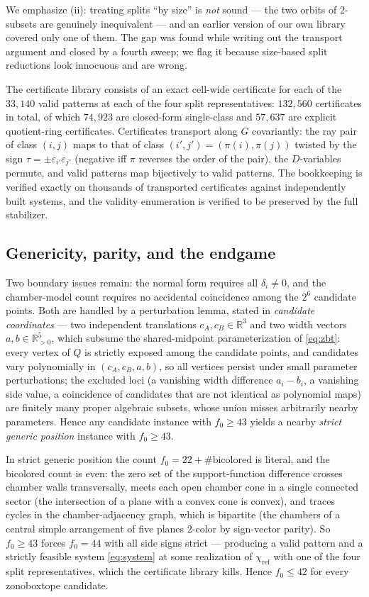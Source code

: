 \documentclass[11pt]{amsart}
\theoremstyle{remark}
\newcommand{\RR}{\mathbb{R}}
\begin{document}
We emphasize (ii): treating splits ``by size'' is \emph{not} sound ---
the two orbits of $2$-subsets are genuinely inequivalent --- and an
earlier version of our own library covered only one of them. The gap
was found while writing out the transport argument and closed by a
fourth sweep; we flag it because size-based split reductions look
innocuous and are wrong.

The certificate library consists of an exact cell-wide certificate for
each of the $33{,}140$ valid patterns at each of the four split
representatives: $132{,}560$ certificates in total, of which $74{,}923$
are closed-form single-class and $57{,}637$ are explicit
quotient-ring certificates. Certificates transport along $G$
covariantly: the ray pair of class $(i,j)$ maps to that of class
$(i',j')=(\pi(i),\pi(j))$ twisted by the sign
$\tau=\pm\varepsilon_{i'}\varepsilon_{j'}$ (negative iff $\pi$
reverses the order of the pair), the $D$-variables permute, and valid
patterns map bijectively to valid patterns. The bookkeeping is verified
exactly on thousands of transported certificates against independently
built systems, and the validity enumeration is verified to be preserved
by the full stabilizer.

\subsection{Genericity, parity, and the endgame}\label{sec:endgame}
Two boundary issues remain: the normal form requires all
$\delta_i\ne 0$, and the chamber-model count requires no accidental
coincidence among the $2^{6}$ candidate points. Both are handled by a
perturbation lemma, stated in \emph{candidate coordinates} --- two
independent translations $c_A, c_B\in\RR^3$ and two width vectors
$a, b\in\RR^{5}_{>0}$, which subsume the shared-midpoint
parameterization of \eqref{eq:zbt}: every vertex of $Q$ is strictly
exposed among the candidate points, and candidates vary polynomially
in $(c_A, c_B, a, b)$, so all vertices persist under small parameter
perturbations; the excluded loci (a vanishing width difference
$a_i-b_i$, a vanishing side value, a coincidence of candidates that
are not identical as polynomial maps) are finitely many proper
algebraic subsets, whose union misses arbitrarily nearby parameters.
Hence any candidate instance with $f_0\ge 43$ yields a nearby
\emph{strict generic position} instance with $f_0\ge 43$.

In strict generic position the count
$f_0 = 22 + \#\text{bicolored}$ is literal, and the bicolored count is
even: the zero set of the support-function difference crosses chamber
walls transversally, meets each open chamber cone in a single
connected sector (the intersection of a plane with a convex cone is
convex), and traces cycles in the chamber-adjacency graph, which
is bipartite (the chambers of a central simple arrangement of five
planes $2$-color by sign-vector parity). So $f_0\ge 43$ forces
$f_0=44$ with all side signs strict --- producing a valid pattern and a
strictly feasible system \eqref{eq:system} at some realization of
$\chi_{\mathrm{ref}}$ with one of the four split representatives, which
the certificate library kills. Hence $f_0\le 42$ for every zonoboxtope
candidate.
\end{document}
